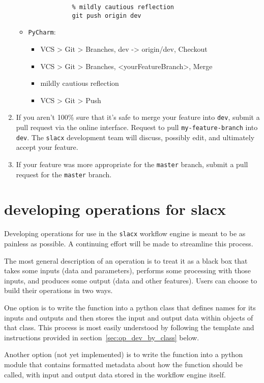 \begin{enumerate}
\begin{itemize}
\begin{lstlisting}
            % mildly cautious reflection 
            git push origin dev
        \end{lstlisting}
        \item \verb|PyCharm|:  
        \begin{itemize} 
            \item VCS > Git > Branches, dev -> origin/dev, Checkout 
            \item VCS > Git > Branches, <yourFeatureBranch>, Merge 
            \item mildly cautious reflection
            \item VCS > Git > Push 
        \end{itemize} 
    \end{itemize} 
    \item If you aren't 100\% sure that it's safe to merge your feature into \verb|dev|,
    submit a pull request via the online interface.
    Request to pull \verb|my-feature-branch| into \verb|dev|.
    The \verb|slacx| development team will discuss, possibly edit, 
    and ultimately accept your feature.
    \item If your feature was more appropriate for the \verb|master| branch,
    submit a pull request for the \verb|master| branch.
\end{enumerate} 

\section{developing operations for slacx}
\label{sec:op_dev}

Developing operations for use in the \verb|slacx| workflow engine 
is meant to be as painless as possible.
A continuing effort will be made to streamline this process.

The most general description of an operation 
is to treat it as a black box that takes some inputs (data and parameters),
performs some processing with those inputs,
and produces some output (data and other features).
Users can choose to build their operations in two ways.

One option is to write the function into a python class
that defines names for its inputs and outputs
and then stores the input and output data 
within objects of that class.
This process is most easily understood 
by following the template and instructions 
provided in section~\ref{sec:op_dev_by_class} below.

Another option (not yet implemented)
is to write the function into a python module 
that contains formatted metadata 
about how the function should be called,
with input and output data 
stored in the workflow engine itself.

